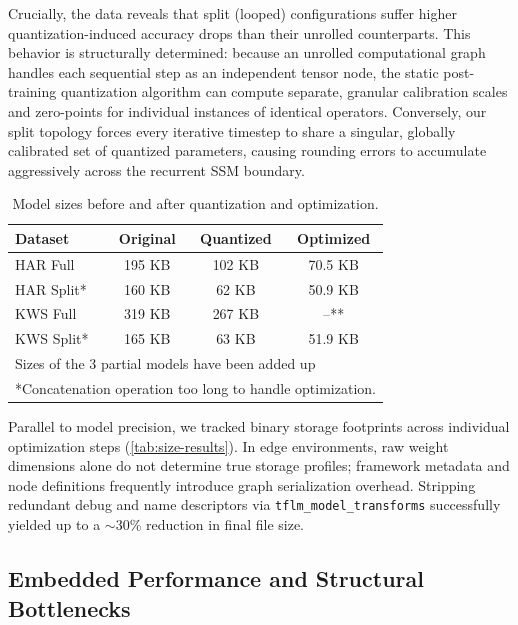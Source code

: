 Crucially, the data reveals that split (looped) configurations suffer higher quantization-induced accuracy drops than their unrolled counterparts. This behavior is structurally determined: because an unrolled computational graph handles each sequential step as an independent tensor node, the static post-training quantization algorithm can compute separate, granular calibration scales and zero-points for individual instances of identical operators. Conversely, our split topology forces every iterative timestep to share a singular, globally calibrated set of quantized parameters, causing rounding errors to accumulate aggressively across the recurrent SSM boundary.

\begin{table}[ht]
  \centering
  \caption{Model sizes before and after quantization and optimization.}
  \label{tab:size-results}
  \begin{tabular}{lccc}
    Dataset & Original & Quantized & Optimized \\
    \midrule
    HAR Full & 195 KB & 102 KB & 70.5 KB \\
    HAR Split* & 160 KB & 62 KB & 50.9 KB \\
    \midrule
    KWS Full & 319 KB & 267 KB & --** \\
    KWS Split* & 165 KB & 63 KB & 51.9 KB \\
    \bottomrule
    \multicolumn{4}{l}{\footnotesize *Sizes of the 3 partial models have been added up} \\
    \multicolumn{4}{l}{\footnotesize **Concatenation operation too long to handle optimization.} \\
  \end{tabular}
\end{table}

Parallel to model precision, we tracked binary storage footprints across individual optimization steps (\autoref{tab:size-results}). In edge environments, raw weight dimensions alone do not determine true storage profiles; framework metadata and node definitions frequently introduce graph serialization overhead. Stripping redundant debug and name descriptors via \texttt{tflm\_model\_transforms} successfully yielded up to a $\sim$30\% reduction in final file size.

\subsection{Embedded Performance and Structural Bottlenecks}

